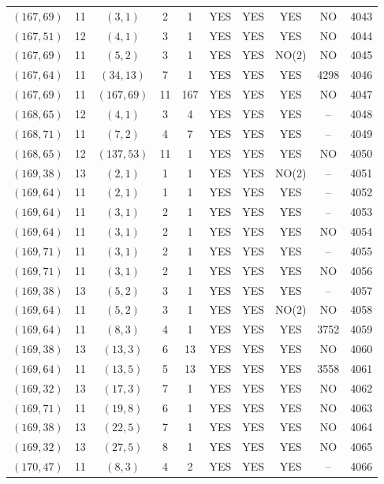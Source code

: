\begin{longtable}{|c|c|c|c|c|c|c|c|c|c|}
$(167, 69)$ & 11 & $(3, 1)$ & 2 & 1 & YES & YES & YES & NO & 4043\\
$(167, 51)$ & 12 & $(4, 1)$ & 3 & 1 & YES & YES & YES & NO & 4044\\
$(167, 69)$ & 11 & $(5, 2)$ & 3 & 1 & YES & YES & NO(2) & NO & 4045\\
$(167, 64)$ & 11 & $(34, 13)$ & 7 & 1 & YES & YES & YES & 4298 & 4046\\
$(167, 69)$ & 11 & $(167, 69)$ & 11 & 167 & YES & YES & YES & NO & 4047\\
$(168, 65)$ & 12 & $(4, 1)$ & 3 & 4 & YES & YES & YES & -- & 4048\\
$(168, 71)$ & 11 & $(7, 2)$ & 4 & 7 & YES & YES & YES & -- & 4049\\
$(168, 65)$ & 12 & $(137, 53)$ & 11 & 1 & YES & YES & YES & NO & 4050\\
$(169, 38)$ & 13 & $(2, 1)$ & 1 & 1 & YES & YES & NO(2) & -- & 4051\\
$(169, 64)$ & 11 & $(2, 1)$ & 1 & 1 & YES & YES & YES & -- & 4052\\
$(169, 64)$ & 11 & $(3, 1)$ & 2 & 1 & YES & YES & YES & -- & 4053\\
$(169, 64)$ & 11 & $(3, 1)$ & 2 & 1 & YES & YES & YES & NO & 4054\\
$(169, 71)$ & 11 & $(3, 1)$ & 2 & 1 & YES & YES & YES & -- & 4055\\
$(169, 71)$ & 11 & $(3, 1)$ & 2 & 1 & YES & YES & YES & NO & 4056\\
$(169, 38)$ & 13 & $(5, 2)$ & 3 & 1 & YES & YES & YES & -- & 4057\\
$(169, 64)$ & 11 & $(5, 2)$ & 3 & 1 & YES & YES & NO(2) & NO & 4058\\
$(169, 64)$ & 11 & $(8, 3)$ & 4 & 1 & YES & YES & YES & 3752 & 4059\\
$(169, 38)$ & 13 & $(13, 3)$ & 6 & 13 & YES & YES & YES & NO & 4060\\
$(169, 64)$ & 11 & $(13, 5)$ & 5 & 13 & YES & YES & YES & 3558 & 4061\\
$(169, 32)$ & 13 & $(17, 3)$ & 7 & 1 & YES & YES & YES & NO & 4062\\
$(169, 71)$ & 11 & $(19, 8)$ & 6 & 1 & YES & YES & YES & NO & 4063\\
$(169, 38)$ & 13 & $(22, 5)$ & 7 & 1 & YES & YES & YES & NO & 4064\\
$(169, 32)$ & 13 & $(27, 5)$ & 8 & 1 & YES & YES & YES & NO & 4065\\
$(170, 47)$ & 11 & $(8, 3)$ & 4 & 2 & YES & YES & YES & -- & 4066\\

\end{longtable}
